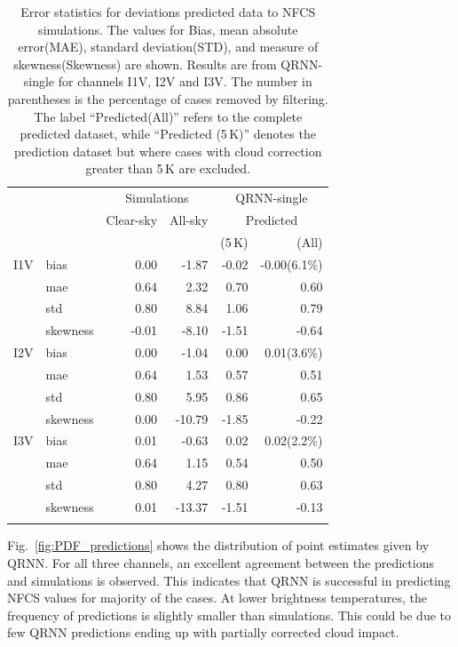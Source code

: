 \documentclass[amt, manuscript]{copernicus}
\begin{document}
\begin{table}[t]
	\caption{ Error statistics for deviations predicted data to NFCS simulations. 
		The values for Bias, mean absolute error(MAE), standard deviation(STD), and measure of skewness(Skewness) are shown. Results are from QRNN-single for channels I1V, I2V and I3V. The number in parentheses is the percentage of cases removed by filtering. The label ``Predicted(All)'' refers to the complete predicted dataset, while ``Predicted (5\,K)'' denotes the prediction dataset but where cases with cloud correction greater than 5\,K are excluded.}
	\label{tab:error_statistics_ici}
	\begin{tabular}{llrr|rr}
		\tophline
		&&\multicolumn{2}{c|}{Simulations}& \multicolumn{2}{c}{QRNN-single} \\
		\cline{3-6}
		&&Clear-sky &   All-sky &  \multicolumn{2}{c}{Predicted}  \\
		&&			   &			&	(5\,K) & (All) \\
		\middlehline
		
		I1V&  bias     &  0.00 & -1.87 & -0.02 & -0.00(6.1\%)  \\
		&mae      &  0.64 &  2.32 &  0.70 &  0.60   \\
		&std      &  0.80 &  8.84 &  1.06 &  0.79   \\
		&skewness & -0.01 & -8.10 & -1.51 & -0.64  \\
		\middlehline
		I2V & bias     & 0.00 &  -1.04 &  0.00 &  0.01(3.6\%)  \\
		&mae      & 0.64 &   1.53 &  0.57 &  0.51 \\
		&std      & 0.80 &   5.95 &  0.86 &  0.65 \\
		&skewness & 0.00 & -10.79 & -1.85 & -0.22  \\
		\middlehline	
		I3V & bias     & 0.01 &  -0.63 &  0.02 &  0.02(2.2\%)  \\
		&mae      & 0.64 &   1.15 &  0.54 &  0.50  \\
		&std      & 0.80 &   4.27 &  0.80 &  0.63  \\
		&skewness & 0.01 & -13.37 & -1.51 & -0.13  \\
		\bottomhline
	\end{tabular}
	\belowtable{} %
\end{table}

Fig.~\ref{fig:PDF_predictions} shows the distribution of point estimates given by QRNN. For all three channels, an excellent agreement between the predictions and simulations is observed. This indicates that QRNN is successful in predicting NFCS values for majority of the cases. At lower brightness temperatures, the frequency of predictions is slightly smaller than simulations. This could be due to few QRNN predictions ending up with partially corrected cloud impact. 
\end{document}
